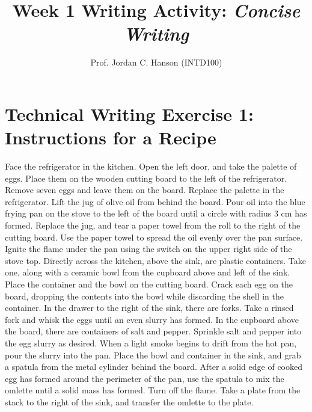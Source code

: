 \documentclass{article}
\begin{document}
\title{Week 1 Writing Activity: \textit{Concise Writing}}
\author{Prof. Jordan C. Hanson (INTD100)}

\maketitle

\section{Technical Writing Exercise 1: Instructions for a Recipe}

Face the refrigerator in the kitchen.  Open the left door, and take the palette of eggs.  Place them on the wooden cutting board to the left of the refrigerator.  Remove seven eggs and leave them on the board.  Replace the palette in the refrigerator.  Lift the jug of olive oil from behind the board.  Pour oil into the blue frying pan on the stove to the left of the board until a circle with radius 3 cm has formed.  Replace the jug, and tear a paper towel from the roll to the right of the cutting board.  Use the paper towel to spread the oil evenly over the pan surface.  Ignite the flame under the pan using the switch on the upper right side of the stove top.  Directly across the kitchen, above the sink, are plastic containers.  Take one, along with a ceramic bowl from the cupboard above and left of the sink.  Place the container and the bowl on the cutting board.  Crack each egg on the board, dropping the contents into the bowl while discarding the shell in the container.  In the drawer to the right of the sink, there are forks.  Take a rinsed fork and whisk the eggs until an even slurry has formed.  In the cupboard above the board, there are containers of salt and pepper.  Sprinkle salt and pepper into the egg slurry as desired.  When a light smoke begins to drift from the hot pan, pour the slurry into the pan.  Place the bowl and container in the sink, and grab a spatula from the metal cylinder behind the board.  After a solid edge of cooked egg has formed around the perimeter of the pan, use the spatula to mix the omlette until a solid mass has formed.  Turn off the flame.  Take a plate from the stack to the right of the sink, and transfer the omlette to the plate.
\end{document}
